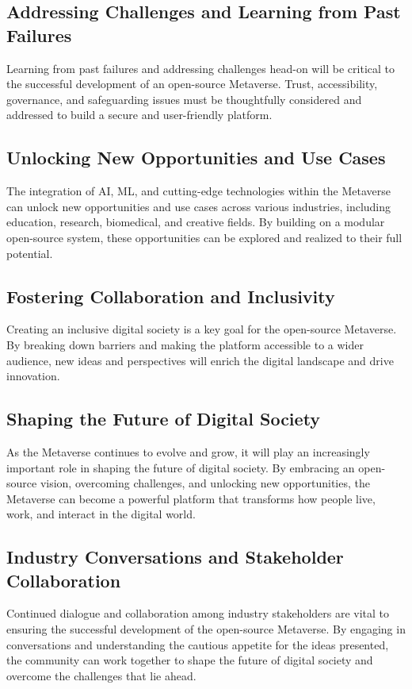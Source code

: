 \subsection{Addressing Challenges and Learning from Past Failures}
Learning from past failures and addressing challenges head-on will be critical to the successful development of an open-source Metaverse. Trust, accessibility, governance, and safeguarding issues must be thoughtfully considered and addressed to build a secure and user-friendly platform.

\subsection{Unlocking New Opportunities and Use Cases}
The integration of AI, ML, and cutting-edge technologies within the Metaverse can unlock new opportunities and use cases across various industries, including education, research, biomedical, and creative fields. By building on a modular open-source system, these opportunities can be explored and realized to their full potential.

\subsection{Fostering Collaboration and Inclusivity}
Creating an inclusive digital society is a key goal for the open-source Metaverse. By breaking down barriers and making the platform accessible to a wider audience, new ideas and perspectives will enrich the digital landscape and drive innovation.

\subsection{Shaping the Future of Digital Society}
As the Metaverse continues to evolve and grow, it will play an increasingly important role in shaping the future of digital society. By embracing an open-source vision, overcoming challenges, and unlocking new opportunities, the Metaverse can become a powerful platform that transforms how people live, work, and interact in the digital world.
\subsection{Industry Conversations and Stakeholder Collaboration}
Continued dialogue and collaboration among industry stakeholders are vital to ensuring the successful development of the open-source Metaverse. By engaging in conversations and understanding the cautious appetite for the ideas presented, the community can work together to shape the future of digital society and overcome the challenges that lie ahead.



